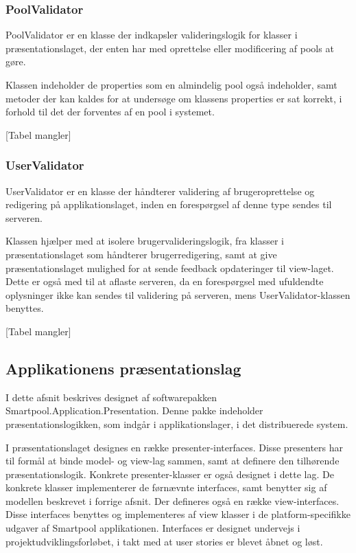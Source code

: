\subsubsection{PoolValidator}
PoolValidator er en klasse der indkapsler valideringslogik for klasser i præsentationslaget, der enten har med oprettelse eller modificering af pools at gøre.

Klassen indeholder de properties som en almindelig pool også indeholder, samt metoder der kan kaldes for at undersøge om klassens properties er sat korrekt, i forhold til det der forventes af en pool i systemet.

[Tabel mangler]

\subsubsection{UserValidator}
UserValidator er en klasse der håndterer validering af brugeroprettelse og redigering på applikationslaget, inden en forespørgsel af denne type sendes til serveren.

Klassen hjælper med at isolere brugervalideringslogik, fra klasser i præsentationslaget som håndterer brugerredigering, samt at give præsentationslaget mulighed for at sende feedback opdateringer til view-laget. Dette er også med til at aflaste serveren, da en forespørgsel med ufuldendte oplysninger ikke kan sendes til validering på serveren, mens UserValidator-klassen benyttes.

[Tabel mangler]

\subsection{Applikationens præsentationslag}
I dette afsnit beskrives designet af softwarepakken Smartpool.Application.Presentation. Denne pakke indeholder præsentationslogikken, som indgår i applikationslager, i det distribuerede system.

I præsentationslaget designes en række presenter-interfaces. Disse presenters har til formål at binde model- og view-lag sammen, samt at definere den tilhørende præsentationslogik. Konkrete presenter-klasser er også designet i dette lag. De konkrete klasser implementerer de førnævnte interfaces, samt benytter sig af modellen beskrevet i forrige afsnit. Der defineres også en række view-interfaces. Disse interfaces benyttes og implementeres af view klasser i de platform-specifikke udgaver af Smartpool applikationen. Interfaces er designet undervejs i projektudviklingsforløbet, i takt med at user stories er blevet åbnet og løst.

